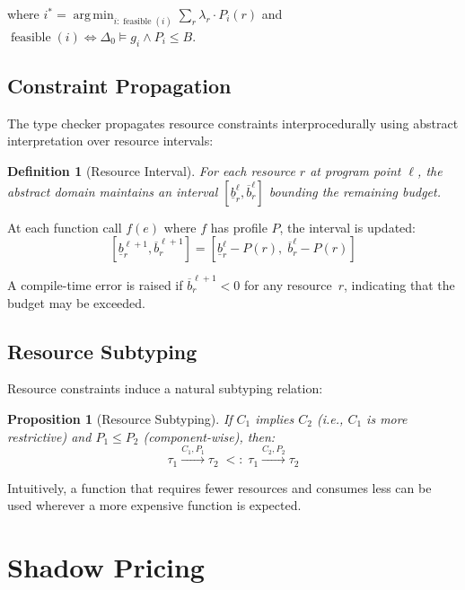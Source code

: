 \documentclass[11pt,a4paper]{article}
\newtheorem{proposition}[theorem]{Proposition}
\newtheorem{definition}[theorem]{Definition}
\DeclareMathOperator*{\argmin}{arg\,min}
\DeclareMathOperator{\feasible}{feasible}
\begin{document}
where $i^* = \argmin_{i : \feasible(i)} \sum_r \lambda_r \cdot P_i(r)$ and
$\feasible(i) \iff \Delta_0 \models g_i \land P_i \leq B$.

\subsection{Constraint Propagation}

The type checker propagates resource constraints interprocedurally using
abstract interpretation over resource intervals:

\begin{definition}[Resource Interval]
For each resource $r$ at program point $\ell$, the abstract domain maintains
an interval $[\underline{b}_r^\ell, \overline{b}_r^\ell]$ bounding the
remaining budget.
\end{definition}

At each function call $f(e)$ where $f$ has profile $P$, the interval is
updated:
\[
  [\underline{b}_r^{\ell+1}, \overline{b}_r^{\ell+1}]
  = [\underline{b}_r^\ell - P(r),\; \overline{b}_r^\ell - P(r)]
\]

A compile-time error is raised if $\overline{b}_r^{\ell+1} < 0$ for any
resource~$r$, indicating that the budget may be exceeded.

\subsection{Resource Subtyping}

Resource constraints induce a natural subtyping relation:

\begin{proposition}[Resource Subtyping]
\label{prop:resource-subtyping}
If $C_1$ implies $C_2$ (i.e., $C_1$ is more restrictive) and $P_1 \leq P_2$
(component-wise), then:
\[
  \tau_1 \xrightarrow{C_1, P_1} \tau_2
  \;<:\;
  \tau_1 \xrightarrow{C_2, P_2} \tau_2
\]
\end{proposition}

Intuitively, a function that requires fewer resources and consumes less can be
used wherever a more expensive function is expected.


\section{Shadow Pricing}
\label{sec:shadow-pricing}
\end{document}
